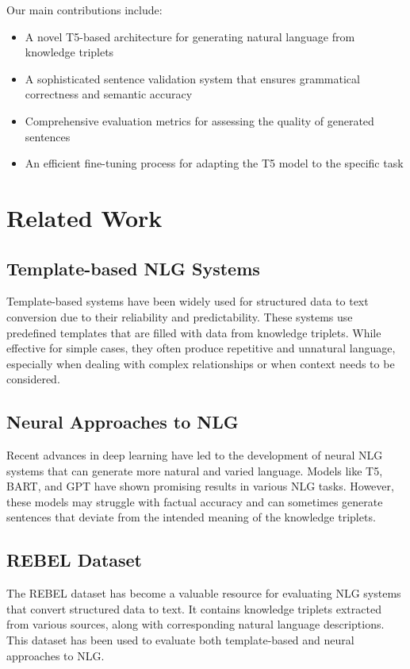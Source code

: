 \documentclass[3p,times,procedia]{elsarticle}
\begin{document}
Our main contributions include:
\begin{itemize}
    \item A novel T5-based architecture for generating natural language from knowledge triplets
    \item A sophisticated sentence validation system that ensures grammatical correctness and semantic accuracy
    \item Comprehensive evaluation metrics for assessing the quality of generated sentences
    \item An efficient fine-tuning process for adapting the T5 model to the specific task
\end{itemize}

\section{Related Work}
\subsection{Template-based NLG Systems}
Template-based systems have been widely used for structured data to text conversion due to their reliability and predictability. These systems use predefined templates that are filled with data from knowledge triplets. While effective for simple cases, they often produce repetitive and unnatural language, especially when dealing with complex relationships or when context needs to be considered.

\subsection{Neural Approaches to NLG}
Recent advances in deep learning have led to the development of neural NLG systems that can generate more natural and varied language. Models like T5, BART, and GPT have shown promising results in various NLG tasks. However, these models may struggle with factual accuracy and can sometimes generate sentences that deviate from the intended meaning of the knowledge triplets.

\subsection{REBEL Dataset}
The REBEL dataset has become a valuable resource for evaluating NLG systems that convert structured data to text. It contains knowledge triplets extracted from various sources, along with corresponding natural language descriptions. This dataset has been used to evaluate both template-based and neural approaches to NLG.
\end{document}
